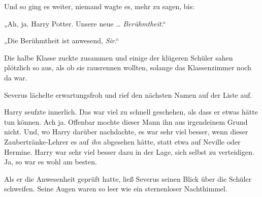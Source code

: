 Und so ging es weiter, niemand wagte es, mehr zu sagen, bis: 

„Ah, ja. Harry Potter. Unsere neue … \emph{Berühmtheit}.“ 

„Die Berühmtheit ist anwesend, \emph{Sir}.“ 

Die halbe Klasse zuckte zusammen und einige der klügeren Schüler sahen plötzlich so aus, als ob sie rausrennen wollten, solange das Klassenzimmer noch da war. 

Severus lächelte erwartungsfroh und rief den nächsten Namen auf der Liste auf. 

Harry seufzte innerlich. Das war viel zu schnell geschehen, als dass er etwas hätte tun können. Ach ja. Offenbar mochte dieser Mann ihn aus irgendeinem Grund nicht. Und, wo Harry darüber nachdachte, es war sehr viel besser, wenn dieser Zaubertränke-Lehrer es auf \emph{ihn} abgesehen hätte, statt etwa auf Neville oder Hermine. Harry war sehr viel besser dazu in der Lage, sich selbst zu verteidigen. Ja, so war es wohl am besten. 

Als er die Anwesenheit geprüft hatte, ließ Severus seinen Blick über die Schüler schweifen. Seine Augen waren so leer wie ein sternenloser Nachthimmel. 

